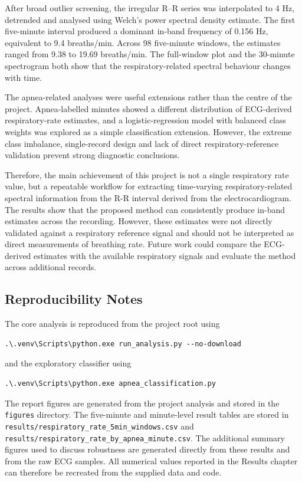 \documentclass[a4paper,10.5pt,oneside]{report}
\begin{document}
After broad outlier screening, the irregular R--R series was interpolated to
4 Hz, detrended and analysed using Welch's power spectral density estimate.
The first five-minute interval produced a dominant in-band frequency of
0.156 Hz, equivalent to 9.4 breaths/min. Across 98 five-minute windows, the
estimates ranged from 9.38 to 19.69 breaths/min. The full-window plot and the
30-minute spectrogram both show that the respiratory-related spectral behaviour
changes with time.

The apnea-related analyses were useful extensions rather than the centre of the project. Apnea-labelled minutes showed a different distribution of ECG-derived respiratory-rate estimates, and a logistic-regression model with balanced class weights was explored as a simple classification extension. However, the extreme class imbalance, single-record design and lack of direct respiratory-reference validation prevent strong diagnostic conclusions.

Therefore, the main achievement of this project is not a single respiratory rate value, but a repeatable workflow for extracting time-varying respiratory-related spectral information from the R-R interval derived from the electrocardiogram. The results show that the proposed method can consistently produce in-band estimates across the recording. However, these estimates were not directly validated against a respiratory reference signal and should not be interpreted as direct measurements of breathing rate. Future work could compare the ECG-derived estimates with the available respiratory signals and evaluate the method across additional records.

\begin{appendices}
\chapter{Reproducibility Notes}

The core analysis is reproduced from the project root using

\begin{verbatim}
.\.venv\Scripts\python.exe run_analysis.py --no-download
\end{verbatim}

and the exploratory classifier using

\begin{verbatim}
.\.venv\Scripts\python.exe apnea_classification.py
\end{verbatim}

The report figures are generated from the project analysis and stored in
the \texttt{figures} directory. The five-minute and minute-level result tables
are stored in \texttt{results/respiratory\_rate\_5min\_windows.csv} and
\texttt{results/respiratory\_rate\_by\_apnea\_minute.csv}. The additional
summary figures used to discuss robustness are generated directly from these
results and from the raw ECG samples. All numerical values reported in the
Results chapter can therefore be recreated from the supplied data and code.
\end{appendices}
\end{document}
